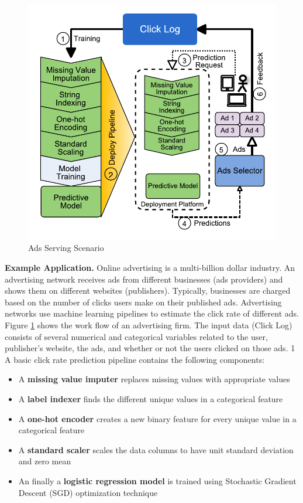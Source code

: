 \begin{figure}[t]
\centering
\includegraphics[width=\columnwidth]{../images/motivational-example.pdf}
\caption{Ads Serving Scenario}
\label{fig:motivational-example}
\end{figure}
\textbf{Example Application.} 
Online advertising is a multi-billion dollar industry.
An advertising network receives ads from different businesses (ads providers) and shows them on different websites (publishers).
Typically, businesses are charged based on the number of clicks users make on their published ads.
Advertising networks use machine learning pipelines to estimate the click rate of different ads.
Figure \ref{fig:motivational-example} shows the work flow of an advertising firm.
The input data (Click Log) consists of several numerical and categorical variables related to the user, publisher's website,  the ads,  and whether or not the users clicked on those ads.
\textcircled{1} A basic click rate prediction pipeline contains the following components:
\begin{itemize}
\item A \textbf{missing value imputer} replaces missing values with appropriate values
\item A \textbf{label indexer} finds the different unique values in a categorical feature 
\item A \textbf{one-hot encoder} creates a new binary feature for every unique value in a categorical feature
\item A \textbf{standard scaler} scales the data columns to have unit standard deviation and zero mean
\item An finally a \textbf{logistic regression model} is trained using Stochastic Gradient Descent (SGD) optimization technique
\end{itemize}
